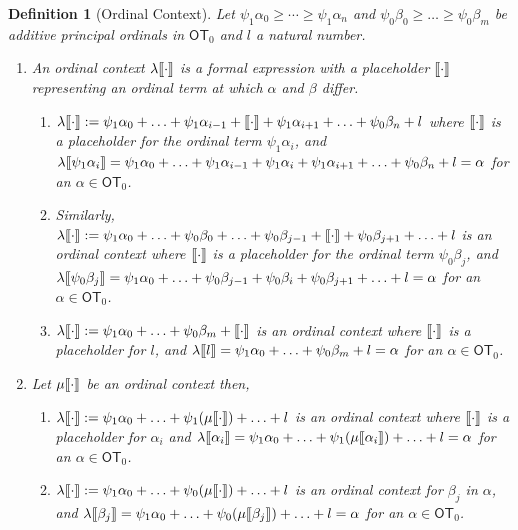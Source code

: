 \documentclass{amsart}
\theoremstyle{plain}
\theoremstyle{plain}
\newtheorem*{definition}{Definition}
\def\scbrl{[\hspace{-.14em}[}
\def\scbrr{]\hspace{-.14em}]}
\def\scbr#1{\scbrl#1\scbrr}
\newcommand\OT{\mathsf{OT}}
\newcommand{\al}{{\alpha}}
\newcommand{\be}{{\beta}}
\newcommand{\la}{\lambda}
\def\scbrl{[\hspace{-.14em}[}
\def\scbrr{]\hspace{-.14em}]}
\def\scbr#1{\scbrl#1\scbrr}
\begin{document}
\begin{definition}[Ordinal Context]
Let $\psi_1\al_0 \geq \cdots \geq \psi_1\al_n $ and $\psi_0\be_0 \geq \ldots \geq \psi_0\be_m$ be additive principal ordinals in $\OT_0$ and $l$ a natural number.

\begin{enumerate}[leftmargin=*]
    \item An ordinal context $\lambda\scbr{\cdot}$ is a formal expression with a placeholder $\scbr{\cdot}$ representing an ordinal term at which $\alpha$ and $\beta$ differ.
    \begin{enumerate}[label=(\roman*)]
        \item $\la\scbr{\cdot} := \psi_1{\al_0} +\ldots  + \psi_1{\al_{i-1}}+ \scbr{\cdot}+\psi_1{\al_{i+1}} +\ldots + \psi_0\be_n+l$ where $\scbr{\cdot}$ is a placeholder for the ordinal term $\psi_1\al_i$, and $\la\scbr{\psi_1\al_i} = \psi_1{\al_0} +\ldots  + \psi_1{\al_{i-1}}+ \psi_1\al_i+\psi_1{\al_{i+1}} +\ldots + \psi_0\be_n+l = \al$ for an $\al \in \OT_0$.
        
        \item Similarly, $\la\scbr{\cdot} := \psi_1{\al_0} +\ldots + \psi_0\be_0 + \ldots + \psi_0\be_{j-1} +\scbr{\cdot} + \psi_0\be_{j+1} +\ldots +l$ is an ordinal context where $\scbr{\cdot}$ is a placeholder for the ordinal term $\psi_0\be_j$, and 
        $\la\scbr{\psi_0\be_j} = \psi_1{\al_0} + \ldots + \psi_0\be_{j-1} + \psi_0\be_i+ \psi_0\be_{j+1} +\ldots +l =\al$ for an $\al \in \OT_0$.
        
        \item  $\la\scbr{\cdot} :=  \psi_1\al_0 + \ldots + \psi_0\be_m+ \scbr{\cdot}$ is an ordinal context where $\scbr{\cdot}$ is a placeholder for $l$, and $\la\scbr{l} =  \psi_1\al_0 + \ldots + \psi_0\be_m+ l=\al$ for an $\al \in \OT_0$.        
    \end{enumerate}
    
    \item Let $\mu\scbr{\cdot}$ be an ordinal context then,
    \begin{enumerate}[label=(\roman*)]
        \item $\la\scbr{\cdot}:= \psi_1{\al_0} +\ldots+ \psi_1(\mu\scbr{\cdot})+\ldots +l$ is an ordinal context where $\scbr{\cdot}$ is a placeholder 
        for $\al_i$ and $\la\scbr{\al_i} = \psi_1{\al_0} +\ldots+ \psi_1(\mu\scbr{\al_i})+\ldots +l= \al$ for an $\al \in \OT_0$.
        \item $\la\scbr{\cdot}:= \psi_1{\al_0} +\ldots+ \psi_0(\mu\scbr{\cdot})+\ldots +l$ is an ordinal context for $\be_j$ in $\al$, and 
        $\la\scbr{\be_j}= \psi_1{\al_0} +\ldots+ \psi_0(\mu\scbr{\be_j})+\ldots +l =\al $ for an $\al\in \OT_0$.
    \end{enumerate}
\end{enumerate}
\end{definition}
\end{document}
